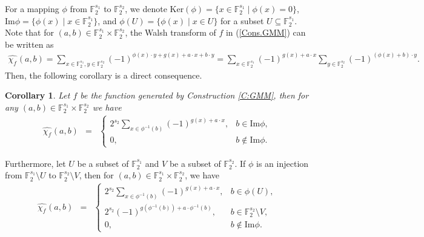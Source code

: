\documentclass[10pt]{article}
\newtheorem{corollary}{Corollary}
\newcommand{\F}{\mathbb{F}}
\newcommand{\0}{\textbf{0}}
\newcommand{\1}{\textbf{1}}
\newcommand{\W}[2][]{\widehat{\chi_{#2}}^{#1}}
\begin{document}
For a mapping $\phi$ from $\F_2^{s_1}$ to $\F_2^{s_2}$,
we denote $\mathrm{Ker}(\phi)=\{x\in \F_2^{s_1}\mid \phi(x)=0\}$,
$\mathrm{Im}\phi=\{\phi(x)\mid x\in \F_2^{s_1}\}$, and $\phi(U)=\{\phi(x)\mid x\in U\}$ for a subset $U\subseteq \F_2^{s_1}$.
Note that for $(a,b)\in\F_2^{s_1}\times\F_2^{s_2}$, the Walsh transform of $f$ in (\ref{Cons.GMM}) can be written as
\begin{align*}
   \W f(a,b)=\sum_{x\in \F_2^{s_1},y\in\F_2^{s_2}}(-1)^{\phi(x)\cdot y+g(x)+a\cdot x+b\cdot y}
    =\sum_{x\in \F_2^{s_1}}(-1)^{g(x)+a\cdot x}\sum_{y\in\F_2^{s_2}}(-1)^{(\phi(x)+b)\cdot y}.
\end{align*}
Then, the following corollary is a direct consequence.

\begin{corollary}\label{thm:walsh-con2}
Let $f$ be the function generated by Construction \ref{C:GMM}, then for any $(a,b)\in\F_2^{s_1}\times\F_2^{s_2}$
we have
\begin{eqnarray}
\W f(a,b)
&=& \left\{
\begin{array}{llllll}
2^{s_2}\sum\limits_{x\in \phi^{-1}(b)}(-1)^{g(x)+a\cdot x},& b\in\mathrm{Im}\phi,\\
0,&b\not\in\mathrm{Im}\phi.
\end{array}
\right.
\end{eqnarray}
\end{corollary}

Furthermore, let $U$ be a subset of $\F_2^{s_1}$ and $V$ be a subset of $\F_2^{s_2}$.
If $\phi$ is an injection from $\F_2^{s_1}\setminus U$ to $\F_2^{s_2}\setminus V$, then for $(a,b)\in\F_2^{s_1}\times\F_2^{s_2}$,
we have
\begin{eqnarray}\label{MM-Wf-1}
\W f(a,b)
&=& \left\{
\begin{array}{llllll}
2^{s_2}\sum\limits_{x\in \phi^{-1}(b)}(-1)^{g(x)+a\cdot x},& b\in\phi(U),\\
2^{s_2}(-1)^{g(\phi^{-1}(b))+a\cdot \phi^{-1}(b)},&b\in\F_2^{s_2}\setminus V,\\
0,&b\not\in\mathrm{Im}\phi.
\end{array}
\right.
\end{eqnarray}
\end{document}
